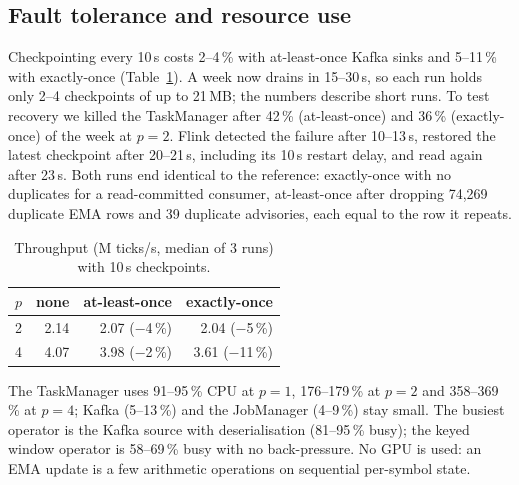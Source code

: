 \subsection{Fault tolerance and resource use}
Checkpointing every 10\,s costs 2--4\,\% with at-least-once Kafka sinks and 5--11\,\% with exactly-once
(Table~\ref{tab:ft}). A week now drains in 15--30\,s, so each run holds only 2--4 checkpoints of up to 21\,MB;
the numbers describe short runs. To test recovery we killed the TaskManager after 42\,\% (at-least-once) and
36\,\% (exactly-once) of the week at $p=2$. Flink detected the failure after 10--13\,s, restored the latest
checkpoint after 20--21\,s, including its 10\,s restart delay, and read again after 23\,s. Both runs end
identical to the reference: exactly-once with no duplicates for a read-committed consumer, at-least-once after
dropping 74,269 duplicate EMA rows and 39 duplicate advisories, each equal to the row it repeats.

\begin{table}[t]
  \caption{Throughput (M ticks/s, median of 3 runs) with 10\,s checkpoints.}
  \label{tab:ft}
  \begin{tabular}{lrrr}
    \toprule
    $p$ & none & at-least-once & exactly-once \\
    \midrule
    2 & 2.14 & 2.07 ($-$4\,\%) & 2.04 ($-$5\,\%) \\
    4 & 4.07 & 3.98 ($-$2\,\%) & 3.61 ($-$11\,\%) \\
    \bottomrule
  \end{tabular}
\end{table}

The TaskManager uses 91--95\,\% CPU at $p=1$, 176--179\,\% at $p=2$ and 358--369\,\% at $p=4$; Kafka
(5--13\,\%) and the JobManager (4--9\,\%) stay small. The busiest operator is the Kafka source with
deserialisation (81--95\,\% busy); the keyed window operator is 58--69\,\% busy with no back-pressure. No GPU is
used: an EMA update is a few arithmetic operations on sequential per-symbol state.
